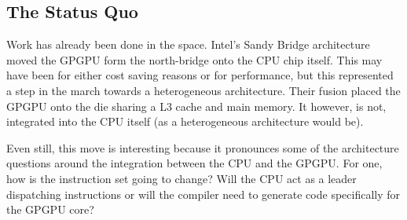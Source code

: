 \subsection*{The Status Quo}

Work has already been done in the space. Intel's Sandy Bridge architecture moved the GPGPU form the north-bridge onto the CPU chip itself. This may have been for either cost saving reasons or for performance, but this represented a step in the march towards a heterogeneous architecture. Their fusion placed the GPGPU onto the die sharing a L3 cache and main memory. It however, is not, integrated into the CPU itself (as a heterogeneous architecture would be). 

Even still, this move is interesting because it pronounces some of the architecture questions around the integration between the CPU and the GPGPU. For one, how is the instruction set going to change? Will the CPU act as a leader dispatching instructions or will the compiler need to generate code specifically for the GPGPU core?  